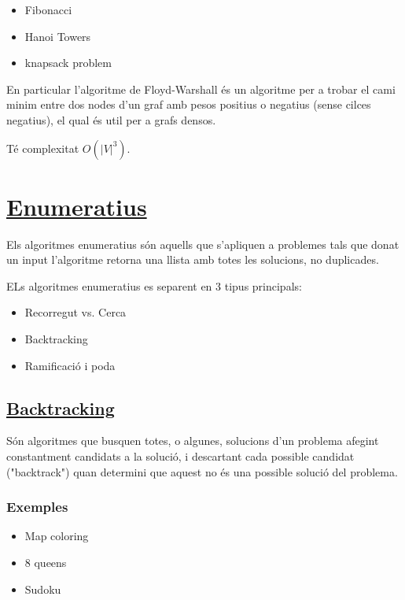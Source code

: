 \documentclass[12pt]{article}
\theoremstyle{definition}
\theoremstyle{definition}
\theoremstyle{definition}
\theoremstyle{definition}
\theoremstyle{definition}
\theoremstyle{definition}
\theoremstyle{definition}
\begin{document}
\begin{itemize}
	\item Fibonacci
	\item Hanoi Towers
	\item knapsack problem
\end{itemize}

En particular l'algoritme de Floyd-Warshall és un algoritme per a trobar el cami minim entre dos nodes d'un graf amb pesos positius o negatius (sense cilces negatius), el qual és util per a grafs densos.


Té complexitat $O(|V|^3)$.

\newpage

\section{\href{https://en.wikipedia.org/wiki/Enumeration_algorithm}{Enumeratius}}

Els algoritmes enumeratius són aquells que s'apliquen a problemes tals que donat un input l'algoritme retorna una llista amb totes les solucions, no duplicades.

ELs algoritmes enumeratius es separent en 3 tipus principals:

\begin{itemize}
	\item Recorregut vs. Cerca
	\item Backtracking
	\item Ramificació i poda
\end{itemize}

\subsection{\href{https://en.wikipedia.org/wiki/Backtracking}{Backtracking}}

Són algoritmes que busquen totes, o algunes, solucions d'un problema afegint constantment candidats a la solució, i descartant cada possible candidat ("backtrack") quan determini que aquest no és una possible solució del problema.

\subsubsection{Exemples}
\begin{itemize}
	\item Map coloring
	\item 8 queens
	\item Sudoku
\end{itemize}
\end{document}
